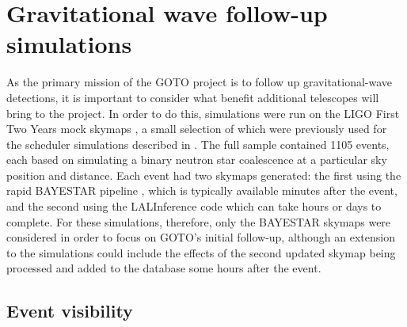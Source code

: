 \section{Gravitational wave follow-up simulations}
\label{sec:gw_sims}
\begin{colsection}


\begin{colsection}

As the primary mission of the GOTO project is to follow up gravitational-wave detections, it is important to consider what benefit additional telescopes will bring to the project. In order to do this, simulations were run on the LIGO First Two Years mock skymaps \citep{First2Years}, a small selection of which were previously used for the scheduler simulations described in . The full sample contained 1105 events, each based on simulating a binary neutron star coalescence at a particular sky position and distance. Each event had two skymaps generated: the first using the rapid BAYESTAR pipeline \citep{BAYESTAR}, which is typically available minutes after the event, and the second using the LALInference code \citep{LALInference} which can take hours or days to complete. For these simulations, therefore, only the BAYESTAR skymaps were considered in order to focus on GOTO's initial follow-up, although an extension to the simulations could include the effects of the second updated skymap being processed and added to the database some hours after the event.

\end{colsection}


\subsection{Event visibility}
\label{sec:gw_visability}
\begin{colsection}


\end{colsection}
\end{colsection}
